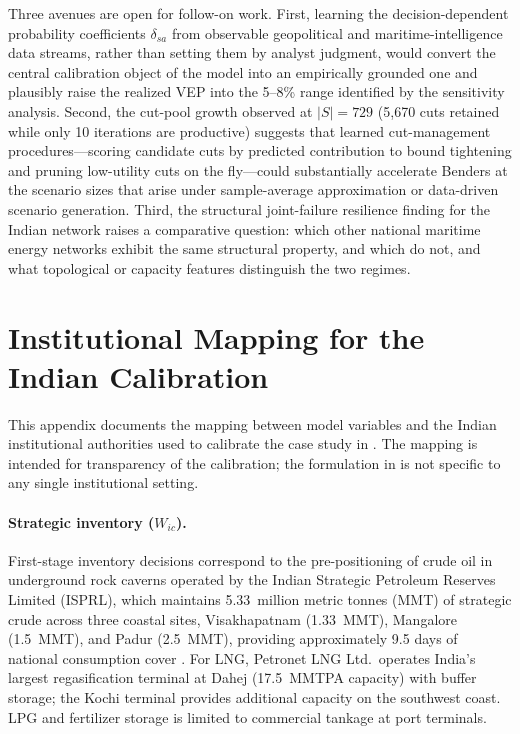 \documentclass[final,3p,authoryear]{elsarticle}
\theoremstyle{definition}
\begin{document}
Three avenues are open for follow-on work. First, learning the
decision-dependent probability coefficients $\delta_{sa}$ from
observable geopolitical and maritime-intelligence data streams, rather
than setting them by analyst judgment, would convert the central
calibration object of the model into an empirically grounded one and
plausibly raise the realized VEP into the 5--8\% range identified by
the sensitivity analysis. Second, the cut-pool growth observed at
$|S|=729$ (5{,}670 cuts retained while only 10 iterations are
productive) suggests that learned cut-management procedures—scoring
candidate cuts by predicted contribution to bound tightening and
pruning low-utility cuts on the fly—could substantially accelerate
Benders at the scenario sizes that arise under sample-average
approximation or data-driven scenario generation. Third, the
structural joint-failure resilience finding for the Indian network
raises a comparative question: which other national maritime energy
networks exhibit the same structural property, and which do not, and
what topological or capacity features distinguish the two regimes.





\appendix

\section{Institutional Mapping for the Indian Calibration}
\label{app:institutional}

This appendix documents the mapping between model variables and the
Indian institutional authorities used to calibrate the case study in
. The mapping is intended for transparency of
the calibration; the formulation in  is not specific to
any single institutional setting.

\paragraph{Strategic inventory ($W_{ic}$).}
First-stage inventory decisions correspond to the pre-positioning of
crude oil in underground rock caverns operated by the Indian Strategic
Petroleum Reserves Limited (ISPRL), which maintains 5.33~million metric
tonnes (MMT) of strategic crude across three coastal sites,
Visakhapatnam (1.33~MMT), Mangalore (1.5~MMT), and Padur (2.5~MMT),
providing approximately 9.5 days of national consumption cover
\citep{eia2016spr, pib2021spr}. For LNG, Petronet LNG Ltd.\ operates
India's largest regasification terminal at Dahej (17.5~MMTPA capacity)
with buffer storage; the Kochi terminal provides additional capacity on
the southwest coast. LPG and fertilizer storage is limited to
commercial tankage at port terminals.
\end{document}
